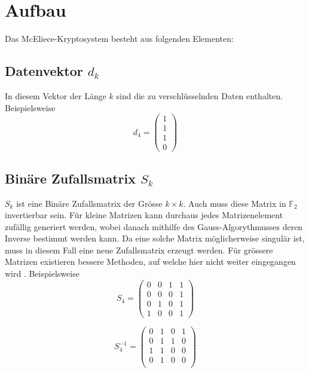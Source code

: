 %
%
%
\section{Aufbau\label{mceliece:section:Aufbau}}
Das McEliece-Kryptosystem besteht aus folgenden Elementen:

\subsection{Datenvektor $d_k$
\label{mceliece:subsection:d_k}}
In diesem Vektor der Länge $k$ sind die zu verschlüsselnden Daten enthalten.
Beispielsweise
\[d_4=
\begin{pmatrix}
    1\\
    1\\
    1\\
    0 
\end{pmatrix}
\]

\subsection{Binäre Zufallsmatrix $S_k$
\label{mceliece:subsection:s_k}}
$S_k$ ist eine Binäre Zufallsmatrix der Grösse $k \times k$.
Auch muss diese Matrix in $\mathbb{F}_2$ invertierbar sein.
Für kleine Matrizen kann durchaus jedes Matrizenelement zufällig generiert werden,
wobei danach mithilfe des Gauss-Algorythmusses deren Inverse bestimmt werden kann.
Da eine solche Matrix möglicherweise singulär ist, muss in diesem Fall eine neue Zufallsmatrix erzeugt werden.
Für grössere Matrizen existieren bessere Methoden, auf welche hier nicht weiter eingegangen wird \cite{mceliece:GenerationRandMatrix}.
Beispielsweise
\[S_4=
    \begin{pmatrix}
        0 & 0 & 1 & 1\\
        0 & 0 & 0 & 1\\
        0 & 1 & 0 & 1\\
        1 & 0 & 0 & 1
    \end{pmatrix}
\]

\[
    S_4^{-1}=
    \begin{pmatrix}
        0 & 1 & 0 & 1\\
        0 & 1 & 1 & 0\\
        1 & 1 & 0 & 0\\
        0 & 1 & 0 & 0\\
    \end{pmatrix}
\]

